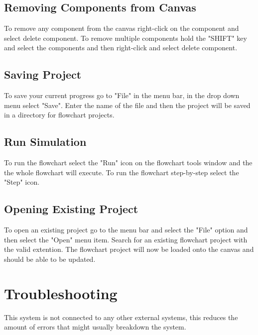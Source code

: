 \documentclass[11pt,a4paper,titlepage]{article}
\begin{document}
	\subsection{Removing Components from Canvas}
	
	To remove any component from the canvas right-click on the component and select delete component. To remove multiple components hold the "SHIFT" key and select the components and then right-click and select delete component.
		
	\subsection{Saving Project}
	
	To save your current progress go to "File" in the menu bar, in the drop down menu select "Save". Enter the name of the file and then the project will be saved in a directory for flowchart projects.
	
	\subsection{Run Simulation}
	To run the flowchart select the "Run" icon on the flowchart tools window and the the whole flowchart will execute. To run the flowchart step-by-step select the "Step" icon.
	
		
	\subsection{Opening Existing Project}
	
	To open an existing project go to the menu bar and select the "File" option and then select the "Open" menu item. Search for an existing flowchart project with the valid extention. The flowchart project will now be loaded onto the canvas and should be able to be updated.
	
\section{Troubleshooting}

This system is not connected to any other external systems, this reduces the amount of errors that might usually breakdown the system.
\end{document}
